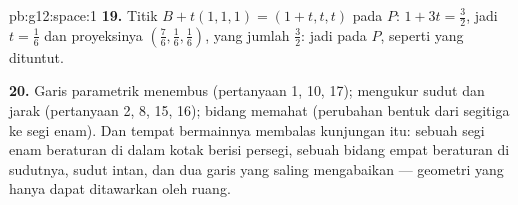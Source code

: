 \begin{solution}{pb:g12:space:1}
\textbf{19.} Titik $B + t(1,1,1) = (1 + t, t, t)$ pada $P$:
$1 + 3t = \frac32$, jadi $t = \frac16$ dan proyeksinya
$\left(\frac76, \frac16, \frac16\right)$, yang jumlah 
$\frac32$: jadi pada $P$, seperti yang dituntut.

\textbf{20.} Garis parametrik menembus (pertanyaan 1, 10, 17);
 mengukur sudut dan jarak (pertanyaan 2, 8,
15, 16);  bidang memahat  (perubahan bentuk dari
segitiga ke segi enam). Dan tempat bermainnya membalas kunjungan itu: sebuah
segi enam beraturan di dalam kotak berisi persegi, sebuah bidang empat beraturan di
sudutnya, sudut intan, dan dua garis yang saling mengabaikan
--- geometri yang hanya dapat ditawarkan oleh ruang.

\end{solution}
